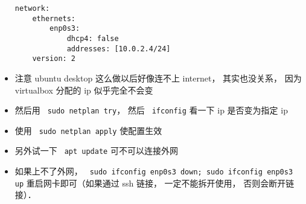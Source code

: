\begin{itemize}
\begin{lstlisting}
network:
    ethernets:
        enp0s3:
            dhcp4: false
            addresses: [10.0.2.4/24]
    version: 2
\end{lstlisting}
\item 注意 ubuntu desktop 这么做以后好像连不上 internet， 其实也没关系， 因为 virtualbox 分配的 ip 似乎完全不会变
\item 然后用 \verb` sudo netplan try`， 然后 \verb` ifconfig` 看一下 ip 是否变为指定 ip
\item 使用 \verb` sudo netplan apply` 使配置生效
\item 另外试一下 \verb` apt update` 可不可以连接外网
\item 如果上不了外网， \verb` sudo ifconfig enp0s3 down; sudo ifconfig enp0s3 up` 重启网卡即可（如果通过 ssh 链接， 一定不能拆开使用， 否则会断开链接）．
\end{itemize}
